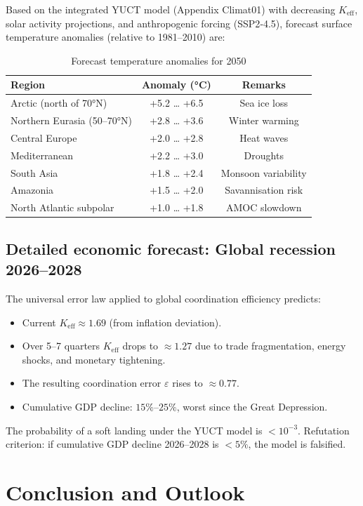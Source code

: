 \documentclass[12pt,a4paper]{article}
\newcommand{\Keff}{K_{\mathrm{eff}}}
\begin{document}
	Based on the integrated YUCT model (Appendix Climat01) with decreasing $\Keff$,
	solar activity projections, and anthropogenic forcing (SSP2‑4.5), forecast
	surface temperature anomalies (relative to 1981–2010) are:
	
	\begin{table}[H]
		\centering
		\caption{Forecast temperature anomalies for 2050}
		\begin{tabular}{lcc}
			\toprule
			Region & Anomaly (°C) & Remarks \\
			\midrule
			Arctic (north of 70°N) & +5.2 … +6.5 & Sea ice loss \\
			Northern Eurasia (50–70°N) & +2.8 … +3.6 & Winter warming \\
			Central Europe & +2.0 … +2.8 & Heat waves \\
			Mediterranean & +2.2 … +3.0 & Droughts \\
			South Asia & +1.8 … +2.4 & Monsoon variability \\
			Amazonia & +1.5 … +2.0 & Savannisation risk \\
			North Atlantic subpolar & +1.0 … +1.8 & AMOC slowdown \\
			\bottomrule
		\end{tabular}
	\end{table}
	
	\subsection{Detailed economic forecast: Global recession 2026–2028}
	
	The universal error law applied to global coordination efficiency predicts:
	\begin{itemize}
		\item Current $\Keff \approx 1.69$ (from inflation deviation).
		\item Over 5–7 quarters $\Keff$ drops to $\approx 1.27$ due to trade fragmentation,
		energy shocks, and monetary tightening.
		\item The resulting coordination error $\varepsilon$ rises to $\approx 0.77$.
		\item Cumulative GDP decline: $15\%$–$25\%$, worst since the Great Depression.
	\end{itemize}
	The probability of a soft landing under the YUCT model is $<10^{-3}$.
	Refutation criterion: if cumulative GDP decline 2026–2028 is $<5\%$, the model
	is falsified.
	
	\section{Conclusion and Outlook}
	
\end{document}
